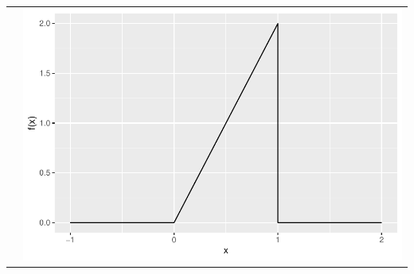 \begin{frame}
\begin{block}{\examplectd}
\begin{tabular}{cc}
      & \includegraphics[height=.325\textheight]{figure/example-16-1-1}\\
    \end{tabular}
  \end{block}
\end{frame}

